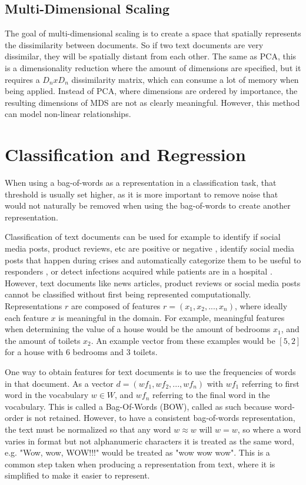 \subsection{Multi-Dimensional Scaling}

The goal of multi-dimensional scaling is to create a space that spatially represents the dissimilarity between documents. So if two text documents are very dissimilar, they will be spatially distant from each other. The same as PCA, this is a dimensionality reduction where the amount of dimensions are specified, but it requires a $D_n x D_n$ dissimilarity matrix, which can consume a lot of memory when being applied. Instead of PCA, where dimensions are ordered by importance, the resulting dimensions of MDS are not as clearly meaningful. However, this method can model non-linear relationships.

\section{Classification and Regression}\label{ch2:ml}

When using a bag-of-words as a representation in a classification task, that threshold is usually set higher, as it is more important to remove noise that would not naturally be removed when using the bag-of-words to create another representation. 

Classification of text documents can be used for example to identify if social media posts, product reviews, etc are positive or negative \cite{Burel2018},  identify social media posts that happen during crises and automatically categorize them to be useful to responders \cite{Burel2018},  or detect infections acquired while patients are in a hospital . However, text documents like news articles, product reviews or social media posts cannot be classified without first being represented computationally.  Representations $r$ are composed of features $r = (x_1, x_2, ..., x_n)$, where ideally each feature $x$  is meaningful in the domain. For example, meaningful features when determining the  value of a house would be the amount of bedrooms $x_1$, and the amount of toilets $x_2$. An example vector from these examples would be $[5,2]$ for a house with 6 bedrooms and 3 toilets.

One way to obtain features for text documents is to use the frequencies of words in that document. As a vector $d = ({wf}_1, {wf}_2, ..., {wf}_n)$ with ${wf}_1$ referring to first word in the vocabulary $w \in W$, and ${wf}_n$  referring to the final word in the vocabulary. This is called a Bag-Of-Words (BOW), called as such because word-order is not retained. However, to have a consistent bag-of-words representation, the text must be normalized so that any word $w \approx w$ will  $w = w$, so where a word varies in format but not alphanumeric characters it is treated as the same word, e.g. "Wow, wow, WOW!!!" would be treated as  "wow wow wow". This is a common step taken when producing a representation from text, where it is simplified to make it easier to represent.

